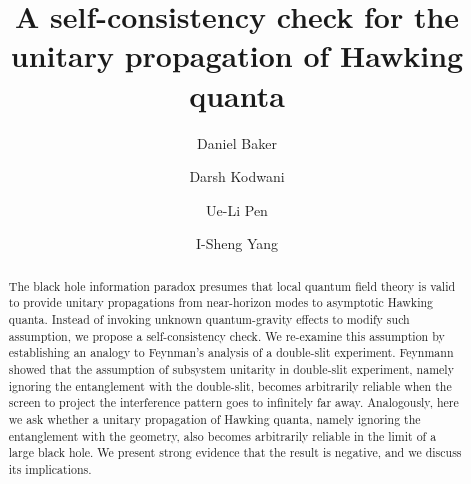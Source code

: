 \documentclass[aps,showpacs,twocolumn,floats,prd,superscriptaddress,nofootinbib]{revtex4-1}
\begin{document}
\title{A self-consistency check for the unitary propagation of Hawking quanta}

\author{Daniel Baker}

\author{Darsh Kodwani}

\author{Ue-Li Pen}

\author{I-Sheng Yang}


\begin{abstract}
The black hole information paradox presumes that local quantum field theory is valid to provide unitary propagations from near-horizon modes to asymptotic Hawking quanta. 
Instead of invoking unknown quantum-gravity effects to modify such assumption, we propose a self-consistency check.
We re-examine this assumption by establishing an analogy to Feynman's analysis of a double-slit experiment. 
Feynmann showed that the assumption of subsystem unitarity in double-slit experiment, namely ignoring the entanglement with the double-slit, becomes arbitrarily reliable when the screen to project the interference pattern goes to infinitely far away.
Analogously, here we ask whether a unitary propagation of Hawking quanta, namely ignoring the entanglement with the geometry, also becomes arbitrarily reliable in the limit of a large black hole. 
We present strong evidence that the result is negative, and we discuss its implications.
\end{abstract}
\end{document}
